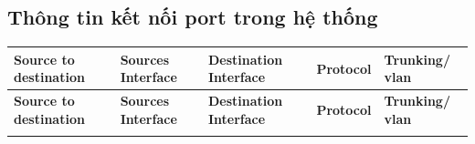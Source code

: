 \documentclass[12pt,a4paper]{report}
\begin{document}
\subsection{Thông tin kết nối port trong hệ thống}
\begin{center}
\def\arraystretch{2.1}\begin{longtable}{|p{}|p{}|p{}|p{}|p{}|}


\hline \textbf{Source to destination }    &      \textbf{Sources Interface }    &      \textbf{Destination Interface }    &    \textbf{Protocol } &     \textbf{Trunking/ vlan }\\ \hline
\endfirsthead



\hline \textbf{Source to destination } &  \textbf{Sources Interface } &  \textbf{Destination Interface } &  \textbf{Protocol } &  \textbf{Trunking/ vlan} \\ \hline
\endhead


\endfoot


\endlastfoot



\end{longtable}
\end{center}
\end{document}
